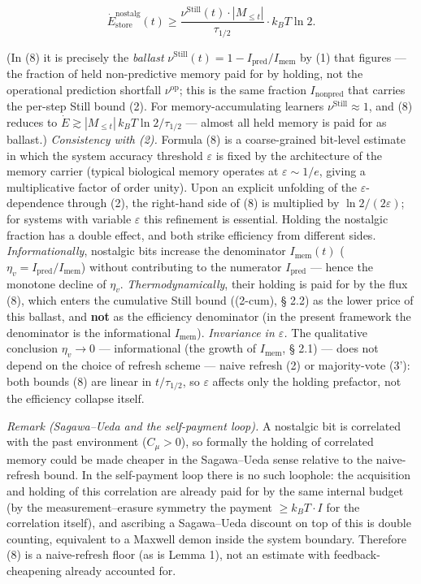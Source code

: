 \documentclass[pdflatex,sn-mathphys-ay]{sn-jnl}
\begin{document}
\begin{equation}\dot{E}_{\text{store}}^{\text{nostalg}}(t) \ge \frac{\nu^{\text{Still}}(t) \cdot |M_{\le t}|}{\tau_{1/2}} \cdot k_B T \ln 2. \tag{8}\end{equation}



(In (8) it is precisely the \emph{ballast} \(\nu^{\text{Still}}(t) = 1 - I_{\text{pred}}/I_{\text{mem}}\) by (1) that figures --- the fraction of held non-predictive memory paid for by holding, not the operational prediction shortfall \(\nu^{\text{op}}\); this is the same fraction \(I_{\text{nonpred}}\) that carries the per-step Still bound (2). For memory-accumulating learners \(\nu^{\text{Still}} \approx 1\), and (8) reduces to \(\dot E \gtrsim |M_{\le t}|\,k_B T\ln 2/\tau_{1/2}\) --- almost all held memory is paid for as ballast.) \emph{Consistency with (2).} Formula (8) is a coarse-grained bit-level estimate in which the system accuracy threshold \(\varepsilon\) is fixed by the architecture of the memory carrier (typical biological memory operates at \(\varepsilon \sim 1/e\), giving a multiplicative factor of order unity). Upon an explicit unfolding of the \(\varepsilon\)-dependence through (2), the right-hand side of (8) is multiplied by \(\ln 2/(2\varepsilon)\); for systems with variable \(\varepsilon\) this refinement is essential. Holding the nostalgic fraction has a double effect, and both strike efficiency from different sides. \emph{Informationally}, nostalgic bits increase the denominator \(I_{\text{mem}}(t)\) (\(\eta_v = I_{\text{pred}}/I_{\text{mem}}\)) without contributing to the numerator \(I_{\text{pred}}\) --- hence the monotone decline of \(\eta_v\). \emph{Thermodynamically}, their holding is paid for by the flux (8), which enters the cumulative Still bound ((2-cum), § 2.2) as the lower price of this ballast, and \textbf{not} as the efficiency denominator (in the present framework the denominator is the informational \(I_{\text{mem}}\)). \emph{Invariance in \(\varepsilon\).} The qualitative conclusion \(\eta_v \to 0\) --- informational (the growth of \(I_{\text{mem}}\), § 2.1) --- does not depend on the choice of refresh scheme --- naive refresh (2) or majority-vote (3'): both bounds (8) are linear in \(t/\tau_{1/2}\), so \(\varepsilon\) affects only the holding prefactor, not the efficiency collapse itself.



\emph{Remark (Sagawa--Ueda and the self-payment loop).} A nostalgic bit is correlated with the past environment (\(C_\mu > 0\)), so formally the holding of correlated memory could be made cheaper in the Sagawa--Ueda sense relative to the naive-refresh bound. In the self-payment loop there is no such loophole: the acquisition and holding of this correlation are already paid for by the same internal budget (by the measurement--erasure symmetry the payment \(\ge k_B T \cdot I\) for the correlation itself), and ascribing a Sagawa--Ueda discount on top of this is double counting, equivalent to a Maxwell demon inside the system boundary. Therefore (8) is a naive-refresh floor (as is Lemma 1), not an estimate with feedback-cheapening already accounted for.
\end{document}
